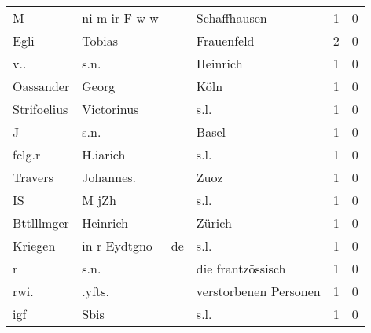 \begin{center}
\begin{tiny}
\begin{longtabu}{llllrr}
                        M &                      ni m ir F w w &             &                                Schaffhausen &          1 &         0 \\
                     Egli &                             Tobias &             &                                  Frauenfeld &          2 &         0 \\
                      v.. &                               s.n. &             &                                    Heinrich &          1 &         0 \\
                Oassander &                              Georg &             &                                        Köln &          1 &         0 \\
              Strifoelius &                         Victorinus &             &                                        s.l. &          1 &         0 \\
                        J &                               s.n. &             &                                       Basel &          1 &         0 \\
                   fclg.r &                           H.iarich &             &                                        s.l. &          1 &         0 \\
                  Travers &                          Johannes. &             &                                        Zuoz &          1 &         0 \\
                       IS &                              M jZh &             &                                        s.l. &          1 &         0 \\
               Bttlllmger &                           Heinrich &             &                                      Zürich &          1 &         0 \\
                  Kriegen &                       in r Eydtgno &          de &                                        s.l. &          1 &         0 \\
                        r &                               s.n. &             &                           die frantzössisch &          1 &         0 \\
                     rwi. &                             .yfts. &             &                       verstorbenen Personen &          1 &         0 \\
                      igf &                               Sbis &             &                                        s.l. &          1 &         0 \\

\end{longtabu}
\end{tiny}
\end{center}
